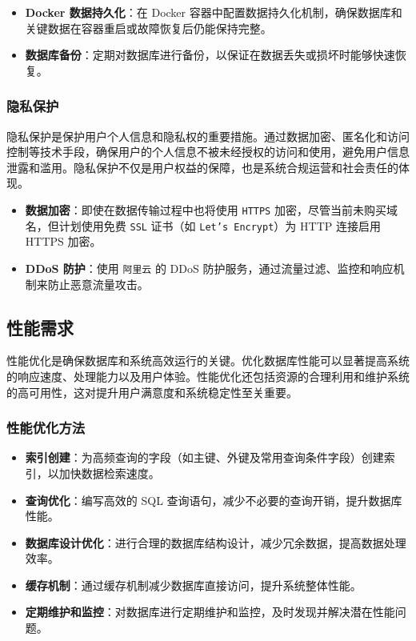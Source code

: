 \begin{itemize}
	\item \textbf{Docker 数据持久化}：在 Docker 容器中配置数据持久化机制，确保数据库和关键数据在容器重启或故障恢复后仍能保持完整。
	\item \textbf{数据库备份}：定期对数据库进行备份，以保证在数据丢失或损坏时能够快速恢复。
\end{itemize}

\subsubsection{隐私保护}

隐私保护是保护用户个人信息和隐私权的重要措施。通过数据加密、匿名化和访问控制等技术手段，确保用户的个人信息不被未经授权的访问和使用，避免用户信息泄露和滥用。隐私保护不仅是用户权益的保障，也是系统合规运营和社会责任的体现。

\begin{itemize}
	\item \textbf{数据加密}：即使在数据传输过程中也将使用 \texttt{HTTPS} 加密，尽管当前未购买域名，但计划使用免费 \texttt{SSL} 证书（如 \texttt{Let's Encrypt}）为 HTTP 连接启用 HTTPS 加密。
	\item \textbf{DDoS 防护}：使用 \texttt{阿里云} 的 DDoS 防护服务，通过流量过滤、监控和响应机制来防止恶意流量攻击。
\end{itemize}

\subsection{性能需求}

性能优化是确保数据库和系统高效运行的关键。优化数据库性能可以显著提高系统的响应速度、处理能力以及用户体验。性能优化还包括资源的合理利用和维护系统的高可用性，这对提升用户满意度和系统稳定性至关重要。

\subsubsection{性能优化方法}

\begin{itemize}
	\item \textbf{索引创建}：为高频查询的字段（如主键、外键及常用查询条件字段）创建索引，以加快数据检索速度。
	\item \textbf{查询优化}：编写高效的 SQL 查询语句，减少不必要的查询开销，提升数据库性能。
	\item \textbf{数据库设计优化}：进行合理的数据库结构设计，减少冗余数据，提高数据处理效率。
	\item \textbf{缓存机制}：通过缓存机制减少数据库直接访问，提升系统整体性能。
	\item \textbf{定期维护和监控}：对数据库进行定期维护和监控，及时发现并解决潜在性能问题。
\end{itemize}


